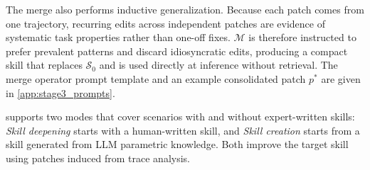 The merge also performs inductive generalization.
Because each patch comes from one trajectory, recurring edits across independent patches are evidence of systematic task properties rather than one-off fixes.
$\mathcal{M}$ is therefore instructed to prefer prevalent patterns and discard idiosyncratic edits, producing a compact skill that replaces $\mathcal{S}_0$ and is used directly at inference without retrieval. The merge operator prompt template and an example consolidated patch $p^*$ are given in \cref{app:stage3_prompts}.


\systemname{} supports two modes that cover scenarios with and without expert-written skills: \emph{Skill deepening} starts with a human-written skill, and \emph{Skill creation} starts from a skill generated from LLM parametric knowledge. Both improve the target skill using patches induced from trace analysis.

